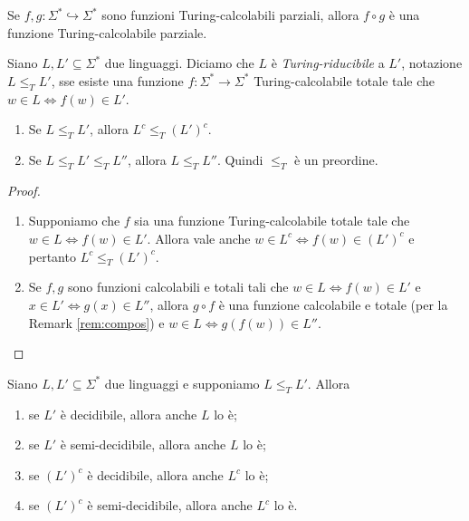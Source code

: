 \documentclass[runningheads,a4paper]{llncs}
\begin{document}
\begin{remark}\label{rem:compos}
Se $f,g: \Sigma^* \hookrightarrow \Sigma^*$ sono funzioni Turing-calcolabili parziali, allora $f \circ g$ \`{e} una funzione Turing-calcolabile parziale.
\end{remark}

\begin{definition}\label{def:Turing-rid}
Siano $L,L' \subseteq \Sigma^*$ due linguaggi. Diciamo che $L$ \`{e} \emph{Turing-riducibile} a $L'$, notazione $L \leq_T L'$, sse esiste una funzione $f: \Sigma^* \to \Sigma^*$ Turing-calcolabile totale tale che $w \in L \iff f(w) \in L'$.
\end{definition}

\begin{proposition}\label{prop:Turing-rid-comp}
\begin{enumerate}[label=(\roman*)]
\item Se $L \leq_T L'$, allora $L^c \leq_T (L')^c$.
\item Se $L \leq_T L' \leq_T L''$, allora $L \leq_T L''$. Quindi $\leq_T$ \`{e} un preordine.
\end{enumerate}
\end{proposition}

\begin{proof}
\begin{enumerate}[label=(\roman*)]
\item Supponiamo che $f$ sia una funzione Turing-calcolabile totale tale che $w \in L \iff f(w) \in L'$. Allora vale anche $w \in L^c \iff f(w) \in (L')^c$ e pertanto $L^c \leq_T (L')^c$.
\item Se $f,g$ sono funzioni calcolabili e totali tali che $w \in L \iff f(w) \in L'$ e $x \in L' \iff g(x) \in L''$, allora $g \circ f$ \`{e} una funzione calcolabile e totale (per la Remark \ref{rem:compos}) e $w \in L \iff g(f(w)) \in L''$.
\end{enumerate}
\end{proof}

\begin{theorem}\label{thm:Turing-rid}
Siano $L,L' \subseteq \Sigma^*$ due linguaggi e supponiamo $L \leq_T L'$. Allora
\begin{enumerate}[label=(\roman*)]
\item se $L'$ \`{e} decidibile, allora anche $L$ lo \`{e};
\item se $L'$ \`{e} semi-decidibile, allora anche $L$ lo \`{e};
\item se $(L')^c$ \`{e} decidibile, allora anche $L^c$ lo \`{e};
\item se $(L')^c$ \`{e} semi-decidibile, allora anche $L^c$ lo \`{e}.
\end{enumerate}
\end{theorem}
\end{document}
